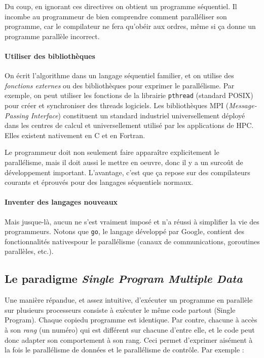 Du coup, en ignorant ces directives on obtient un programme séquentiel. Il
incombe au programmeur de bien comprendre comment paralléliser son programme,
car le compilateur \og ne fera qu'obéir aux ordres\fg, même si ça donne un
programme parallèle incorrect.

\paragraph{Utiliser des bibliothèques} On écrit l'algorithme dans un langage
séquentiel \og familier\fg, et on utilise des \emph{fonctions externes} ou des
bibliothèques pour exprimer le parallélisme. Par exemple, on peut utiliser les
fonctions de la librairie \texttt{pthread} (standard POSIX) pour créer et
synchroniser des threads logiciels. Les bibliothèques \textsf{MPI}
(\textit{Message-Passing Interface}) constituent un standard industriel
universellement déployé dans les centres de calcul et universellement utilisé
par les applications de HPC. Elles existent nativement en C et en Fortran.

Le programmeur doit non seulement faire apparaître explicitement le
parallélisme, mais il doit aussi le mettre en oeuvre, donc il y a un surcoût de
développement important. L'avantage, c'est que ça repose sur des compilateurs
courants et éprouvés pour des langages séquentiels normaux.

\paragraph{Inventer des langages nouveaux} Mais jusque-là, aucun ne s'est
vraiment imposé et n'a réussi à simplifier la vie des programmeurs. Notons que
\texttt{go}, le langage développé par Google, contient des fonctionnalités \og
natives\fg pour le parallélisme (canaux de communications, \og goroutines\fg
parallèles, etc.).

\subsection{Le paradigme \og \textit{Single Program Multiple Data}\fg}

Une manière répandue, et assez intuitive, d'exécuter un programme en parallèle
sur plusieurs processeurs consiste à exécuter le même code partout (Single
Program). Chaque \og copie\fg du programme est identique. Par contre, chacune à
accès à son \emph{rang} (un numéro) qui est différent sur chacune d'entre elle,
et le code peut donc adapter son comportement à son rang. Ceci permet d'exprimer
aisément à la fois le parallélisme de données et le parallélisme de
contrôle. Par exemple :

